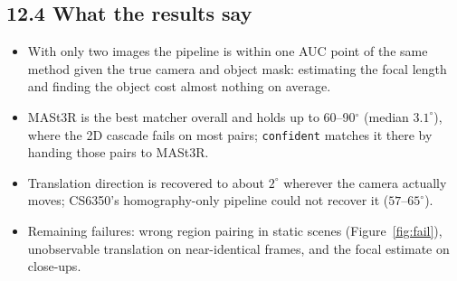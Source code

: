 \documentclass[11pt,a4paper]{article}
\begin{document}
\begin{table}[H]\centering\small
{}
\caption{Against CS6350.pdf (one TUM cabinet sequence, homography only, $f=\max(W,H)$). ``Ours'' larger motion: Euler track (Fig.~\ref{fig:euler}) / the 12 main pairs at 5--15$^\circ$. Different sequences, so indicative, not like for like.}
\end{table}

\subsection*{12.4 What the results say}
\begin{itemize}
  \item With only two images the pipeline is within one AUC point of the same method given the true camera and object mask: estimating the focal length and finding the object cost almost nothing on average.
  \item MASt3R is the best matcher overall and holds up to 60--90$^\circ$ (median $3.1^\circ$), where the 2D cascade fails on most pairs; \texttt{confident} matches it there by handing those pairs to MASt3R.
  \item Translation direction is recovered to about $2^\circ$ wherever the camera actually moves; CS6350's homography-only pipeline could not recover it ($57$--$65^\circ$).
  \item Remaining failures: wrong region pairing in static scenes (Figure~\ref{fig:fail}), unobservable translation on near-identical frames, and the focal estimate on close-ups.
\end{itemize}
\end{document}
